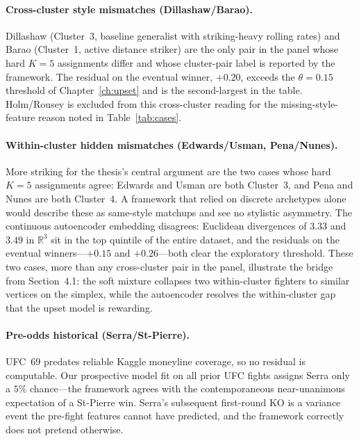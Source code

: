 \documentclass[12pt,oneside]{report}
\begin{document}
\paragraph{Cross-cluster style mismatches (Dillashaw/Barao).}
Dillashaw (Cluster~3, baseline generalist with striking-heavy
rolling rates) and Barao (Cluster~1, active distance striker) are
the only pair in the panel whose hard \(K = 5\) assignments differ and
whose cluster-pair label is reported by the framework.  The
residual on the eventual winner, $+0.20$, exceeds the
\(\theta = 0.15\) threshold of Chapter~\ref{ch:upset} and is the
second-largest in the table.  Holm/Rousey is excluded from this cross-cluster reading for the missing-style-feature reason noted in Table~\ref{tab:cases}.

\paragraph{Within-cluster hidden mismatches (Edwards/Usman,
Pena/Nunes).}  More striking for the thesis's central argument are
the two cases whose hard \(K = 5\) assignments agree: Edwards
and Usman are both Cluster~3, and Pena and Nunes are both
Cluster~4.  A framework that relied on discrete archetypes alone
would describe these as same-style matchups and see no stylistic
asymmetry.  The continuous autoencoder embedding disagrees:
Euclidean divergences of $3.33$ and $3.49$ in \(\mathbb{R}^3\) sit in
the top quintile of the entire dataset, and the residuals on the
eventual winners---$+0.15$ and $+0.26$---both clear the
exploratory threshold.  These two cases, more than any cross-cluster
pair in the panel, illustrate the bridge from
Section~4.1: the soft mixture collapses two within-cluster fighters
to similar vertices on the simplex, while the autoencoder resolves
the within-cluster gap that the upset model is rewarding.

\paragraph{Pre-odds historical (Serra/St-Pierre).}  UFC~69 predates
reliable Kaggle moneyline coverage, so no residual is computable.
Our prospective model fit on all prior UFC fights assigns Serra only
a $5\%$ chance---the framework agrees with the contemporaneous
near-unanimous expectation of a St-Pierre win.  Serra's subsequent
first-round KO is a variance event the pre-fight features cannot
have predicted, and the framework correctly does not pretend
otherwise.
\end{document}
